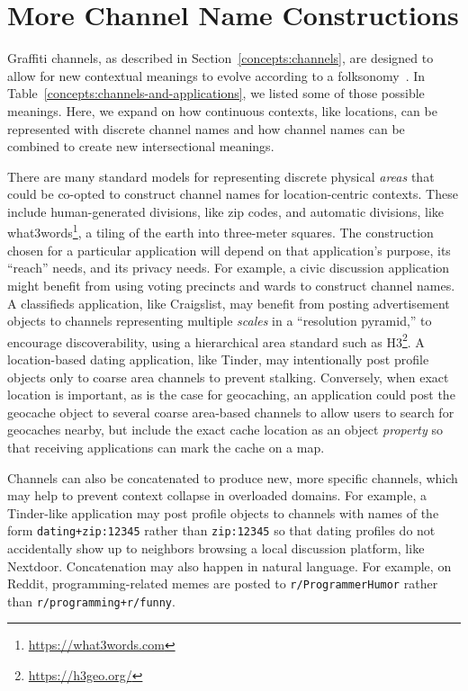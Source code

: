 \section{More Channel Name Constructions}
\label{appendix:more-channel-names}

Graffiti channels, as described in
Section~\ref{concepts:channels},
are designed to allow for new contextual meanings to evolve according to a folksonomy~\cite{folksonomy}.
In Table~\ref{concepts:channels-and-applications},
we listed some of those possible meanings.
Here, we expand on how continuous
contexts, like locations, can be represented with
discrete channel names and how channel names
can be combined to create new
intersectional meanings.

There are many standard models for representing
discrete physical \emph{areas} that could be co-opted to construct channel
names for location-centric contexts. These include
human-generated divisions, like zip codes,
and automatic divisions, like what3words\footnote{
    \url{https://what3words.com}
}, a tiling of the earth into three-meter squares.
The construction chosen for a particular application will
depend on that application's purpose,
its ``reach'' needs, and its privacy needs.
For example, a civic discussion application
might benefit from using voting precincts and wards
to construct channel names.
A classifieds application, like Craigslist, may benefit from posting
advertisement objects to channels representing multiple \emph{scales}
in a ``resolution pyramid,'' to encourage discoverability,
using a hierarchical area standard such as H3\footnote{
    \url{https://h3geo.org/}
}.
A location-based dating application, like Tinder, may intentionally
post profile objects only to coarse area channels to prevent stalking.
Conversely, when exact location is important,
as is the case for geocaching, an application could post the geocache
object to several coarse area-based channels to allow users
to search for geocaches nearby, but include
the exact cache location as an object \emph{property}
so that receiving applications can mark the cache on a map.

Channels can also be concatenated to produce new, more specific channels,
which may help to prevent context collapse in overloaded domains.
For example, a Tinder-like application may post profile objects
to channels with names of the form
\texttt{dating+\allowbreak{}zip:\allowbreak{}12345} rather than
\texttt{zip:\allowbreak{}12345} so that dating profiles
do not accidentally show up to neighbors browsing a local
discussion platform, like Nextdoor.
Concatenation may also happen in natural language.
For example, on Reddit,
programming-related memes are posted to \texttt{r/\allowbreak{}Programmer\allowbreak{}Humor}
rather than \texttt{r/\allowbreak{}programming+\allowbreak{}r/funny}.

